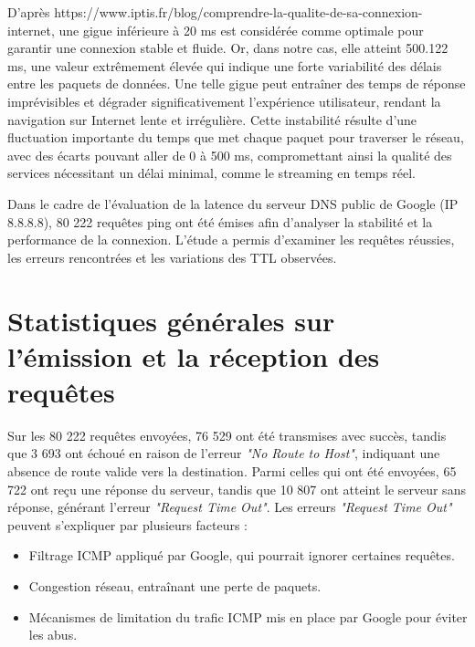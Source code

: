 D'après https://www.iptis.fr/blog/comprendre-la-qualite-de-sa-connexion-internet, une gigue inférieure à 20 ms est considérée comme optimale pour garantir une connexion stable et fluide. Or, dans notre cas, elle atteint 500.122 ms, une valeur extrêmement élevée qui indique une forte variabilité des délais entre les paquets de données. Une telle gigue peut entraîner des temps de réponse imprévisibles et dégrader significativement l'expérience utilisateur, rendant la navigation sur Internet lente et irrégulière. Cette instabilité résulte d’une fluctuation importante du temps que met chaque paquet pour traverser le réseau, avec des écarts pouvant aller de 0 à 500 ms, compromettant ainsi la qualité des services nécessitant un délai minimal, comme  le streaming en temps réel.



\newpage
\chaptitle
\fancyhead[l]{}
\vspace{0.2cm}\vspace{0.4cm}

Dans le cadre de l'évaluation de la latence du serveur DNS public de Google (IP 8.8.8.8), 80 222 requêtes ping ont été émises afin d'analyser la stabilité et la performance de la connexion. L'étude a permis d'examiner les requêtes réussies, les erreurs rencontrées et les variations des TTL observées.

\section{Statistiques générales sur l'émission et la réception des requêtes}
Sur les 80 222 requêtes envoyées, 76 529 ont été transmises avec succès, tandis que 3 693 ont échoué en raison de l'erreur \textit{"No Route to Host"}, indiquant une absence de route valide vers la destination. Parmi celles qui ont été envoyées, 65 722 ont reçu une réponse du serveur, tandis que 10 807 ont atteint le serveur sans réponse, générant l'erreur \textit{"Request Time Out"}.
Les erreurs \textit{"Request Time Out"} peuvent s’expliquer par plusieurs facteurs :
\begin{itemize}
	\item Filtrage ICMP appliqué par Google, qui pourrait ignorer certaines requêtes.
	\item Congestion réseau, entraînant une perte de paquets.
	\item Mécanismes de limitation du trafic ICMP mis en place par Google pour éviter les abus.
\end{itemize}

